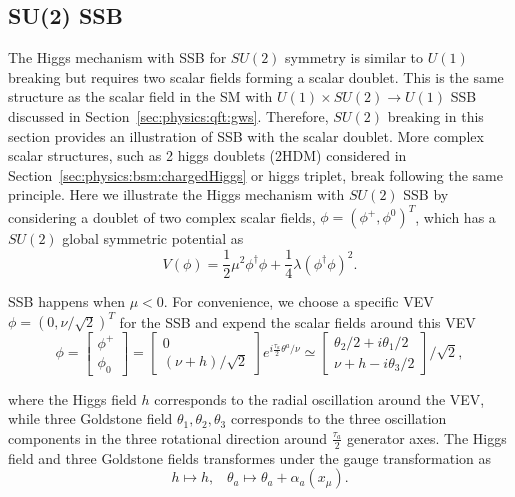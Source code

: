 \subsection{SU(2) SSB}
The Higgs mechanism with SSB for $SU(2)$ symmetry is similar to $U(1)$ breaking but requires two scalar fields forming a scalar doublet. This is the same structure as the scalar field in the SM with $U(1)\times SU(2) \to U(1)$ SSB discussed in Section~\ref{sec:physics:qft:gws}. Therefore,  $SU(2)$ breaking in this section provides an illustration of SSB with the scalar doublet. More complex scalar structures, such as 2 higgs doublets (2HDM) considered in Section~\ref{sec:physics:bsm:chargedHiggs} or higgs triplet, break following the same principle. Here we illustrate the Higgs mechanism with $SU(2)$ SSB by considering a doublet of two complex scalar fields, $\phi = (\phi^+, \phi^0)^T$, which has a $SU(2)$  global symmetric potential as
\begin{equation}
    V(\phi) = \frac{1}{2} \mu^2 \phi^\dagger\phi + \frac{1}{4} \lambda(\phi^\dagger\phi )^2.
\end{equation}

\noindent SSB happens when $\mu<0$. For convenience, we choose a specific VEV $\phi = (0, \nu/\sqrt{2})^T$ for the SSB and expend the scalar fields around this VEV
\begin{equation}
    \phi = \begin{bmatrix} \phi^+ \\ \phi_0 \end{bmatrix} =
    \begin{bmatrix} 0 \\ (\nu + h)/\sqrt{2} \end{bmatrix} e^{i \frac{\tau_a}{2} \theta^a  /\nu}
    \simeq \begin{bmatrix} \theta_2/2 + i\theta_1/2 \\ \nu + h - i\theta_3/2 \end{bmatrix} /\sqrt{2},
    \label{eqn:physics:qft:su2Higgs}
\end{equation}

\noindent where the Higgs field $h$ corresponds to the radial oscillation around the VEV, while three Goldstone field $\theta_1,\theta_2,\theta_3$ corresponds to the three oscillation components in the three rotational direction around $\frac{\tau_a}{2}$ generator axes. The Higgs field and three Goldstone fields transformes under the gauge transformation as 
\begin{equation}
    h  \longmapsto  h ,\;\;\; 
    \theta_a  \longmapsto  \theta_a + \alpha_a(x_\mu).
\end{equation}





